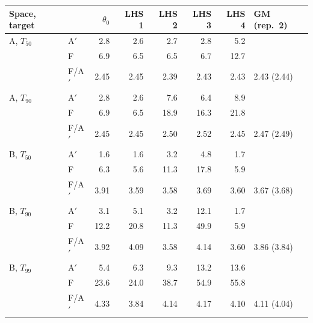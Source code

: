 \begin{tabular}{llrrrrrl}\toprule
Space, target & & $\theta_0$ & LHS 1 & LHS 2 & LHS 3 & LHS 4 & GM (rep.~2)\\\midrule
A, $T_{50}$ & A$'$ & 2.8 & 2.6 & 2.7 & 2.8 & 5.2 & \\
 & F & 6.9 & 6.5 & 6.5 & 6.7 & 12.7 & \\
 & F/A$'$ & 2.45 & 2.45 & 2.39 & 2.43 & 2.43 & 2.43 (2.44)\\
\addlinespace
A, $T_{90}$ & A$'$ & 2.8 & 2.6 & 7.6 & 6.4 & 8.9 & \\
 & F & 6.9 & 6.5 & 18.9 & 16.3 & 21.8 & \\
 & F/A$'$ & 2.45 & 2.45 & 2.50 & 2.52 & 2.45 & 2.47 (2.49)\\
\addlinespace
B, $T_{50}$ & A$'$ & 1.6 & 1.6 & 3.2 & 4.8 & 1.7 & \\
 & F & 6.3 & 5.6 & 11.3 & 17.8 & 5.9 & \\
 & F/A$'$ & 3.91 & 3.59 & 3.58 & 3.69 & 3.60 & 3.67 (3.68)\\
\addlinespace
B, $T_{90}$ & A$'$ & 3.1 & 5.1 & 3.2 & 12.1 & 1.7 & \\
 & F & 12.2 & 20.8 & 11.3 & 49.9 & 5.9 & \\
 & F/A$'$ & 3.92 & 4.09 & 3.58 & 4.14 & 3.60 & 3.86 (3.84)\\
\addlinespace
B, $T_{99}$ & A$'$ & 5.4 & 6.3 & 9.3 & 13.2 & 13.6 & \\
 & F & 23.6 & 24.0 & 38.7 & 54.9 & 55.8 & \\
 & F/A$'$ & 4.33 & 3.84 & 4.14 & 4.17 & 4.10 & 4.11 (4.04)\\
\bottomrule\end{tabular}
